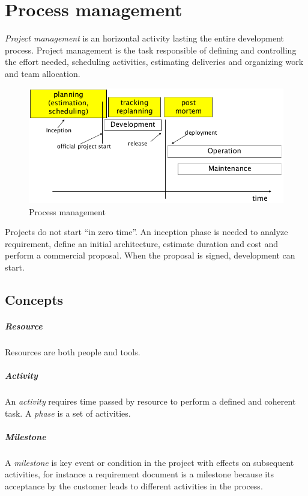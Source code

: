 \chapter{Process management}
\emph{Project management} is an horizontal activity lasting the entire development process. Project management is the task responsible of defining and controlling the effort needed, scheduling activities, estimating deliveries and organizing work and team allocation.

\begin{figure}[hbtp]
\centering
\includegraphics[scale=0.3]{images/process_management.png}
\caption{Process management}
\end{figure}

Projects do not start ``in zero time''. An inception phase is needed to analyze requirement, define an initial architecture, estimate duration and cost and perform a commercial proposal. When the proposal is signed, development can start.

\section{Concepts}
\paragraph{Resource}
Resources are both people and tools.

\paragraph{Activity}
An \emph{activity} requires time passed by resource to perform a defined and coherent task. A \emph{phase} is a set of activities.

\paragraph{Milestone}
A \emph{milestone} is key event or condition in the project with effects on subsequent activities, for instance a requirement document is a milestone because its acceptance by the customer leads to different activities in the process.

